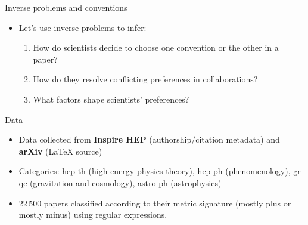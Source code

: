 \documentclass[10pt]{beamer}
\begin{document}
\begin{frame}{Inverse problems and conventions}
    \begin{itemize}
        \item<1-> Let's use inverse problems to infer:
        \begin{enumerate}
            \item<2-> How do scientists decide to choose one convention or the other in a paper?
            \item<3-> How do they resolve conflicting preferences in collaborations?
            \item<4-> What factors shape scientists' preferences?
        \end{enumerate}
    \end{itemize}
\end{frame}

\begin{frame}{Data}
    \begin{itemize}
        \item Data collected from \textbf{Inspire HEP} (authorship/citation metadata) and \textbf{arXiv} (LaTeX source)
        \item Categories: hep-th (high-energy physics theory), hep-ph (phenomenology), gr-qc (gravitation and cosmology), astro-ph (astrophysics)
        \item 22\,500 papers classified according to their metric signature (mostly plus or mostly minus) using regular expressions.
    \end{itemize}
\end{frame}


\end{document}
